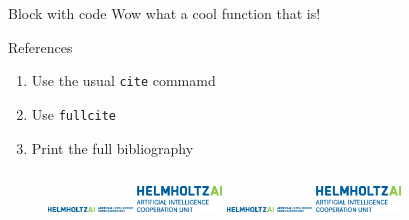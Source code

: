 \documentclass[aspectratio=1610]{beamer}
\begin{document}
\begin{frame}[fragile]{}
\begin{columns}[t]
\begin{column}{.5\linewidth}
\begin{haiblock}{Block with code}
                Wow what a cool function that is!

            \end{haiblock}

            \begin{haiblock}{References}

                \begin{enumerate}
                    \item 
                        Use the usual \texttt{cite} commamd~\cite{baydin_2018}
                    \item 
                        Use \texttt{fullcite} \\
                    \item 
                        Print the full bibliography
                \end{enumerate}

                \printbibliography
            \end{haiblock}

            
        \end{column}
    \end{columns}
    
    \vfill
    \begin{figure}[b]
        \centering
        \includegraphics[width=0.2\textwidth,height=0.055\textheight,keepaspectratio]{logos/helmholtzai_logo_2_lines.eps}%
        \hfill%
        \includegraphics[width=0.2\textwidth,height=0.055\textheight,keepaspectratio]{logos/helmholtzai_logo_3_lines.eps}%
        \hfill%
        \includegraphics[width=0.2\textwidth,height=0.055\textheight,keepaspectratio]{logos/helmholtzai_logo_2_lines.eps}%
        \hfill%
        \includegraphics[width=0.2\textwidth,height=0.055\textheight,keepaspectratio]{logos/helmholtzai_logo_3_lines.eps}%
    \end{figure}
    
  \end{frame}

 
\end{document}

